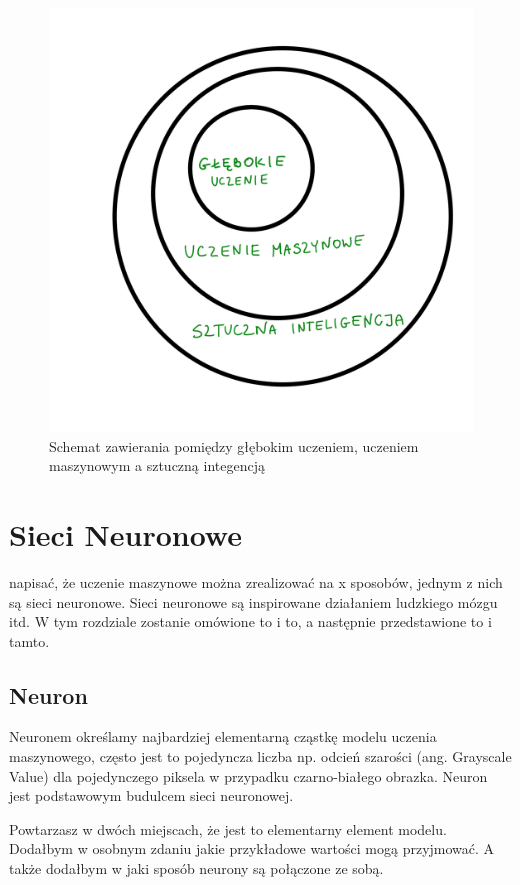 \documentclass[brudnopis]{xmgr}
\begin{document}
\begin{figure}[!tbh]
\centering
\includegraphics[width=.8\hsize]{fig/1}
\caption{Schemat zawierania pomiędzy głębokim uczeniem, uczeniem maszynowym a sztuczną integencją\label{RYS.1}}
\end{figure}




\chapter{Sieci Neuronowe  }

napisać, że uczenie maszynowe można zrealizować na x sposobów, jednym z nich są sieci neuronowe. Sieci neuronowe są inspirowane działaniem ludzkiego mózgu itd. W tym rozdziale zostanie omówione to i to, a następnie przedstawione to i tamto.


\section{Neuron  \label{s:dsssl}}
Neuronem określamy najbardziej elementarną cząstkę modelu uczenia maszynowego, często jest to pojedyncza liczba np. odcień szarości (ang. Grayscale Value) dla pojedynczego piksela w przypadku czarno-białego obrazka. Neuron jest podstawowym budulcem sieci neuronowej. 

Powtarzasz w dwóch miejscach, że jest to elementarny element modelu. Dodałbym w osobnym zdaniu jakie przykładowe wartości mogą przyjmować. A także dodałbym w jaki sposób neurony są połączone ze sobą.
\end{document}
